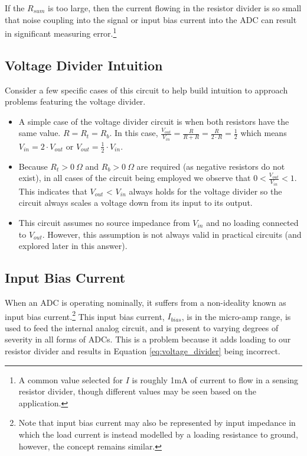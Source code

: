 \documentclass[main.tex]{subfiles}
\begin{document}
\newnoindentpara If the $R_{sum}$ is too large, then the current flowing in the resistor divider is so small that noise coupling into the signal or input bias current into the ADC can result in significant measuring error.\footnote{A common value selected for $I$ is roughly 1mA of current to flow in a sensing resistor divider, though different values may be seen based on the application.}

\subsection{Voltage Divider Intuition}
Consider a few specific cases of this circuit to help build intuition to approach problems featuring the voltage divider.
\begin{itemize}
    \item A simple case of the voltage divider circuit is when both resistors have the same value. $R = R_t = R_b$. In this case, $\frac{V_{out}}{V_{in}} = \frac{R}{R+R} = \frac{R}{2 \cdot R} = \frac{1}{2}$ which means $V_{in} = 2 \cdot V_{out}$ or $V_{out} = \frac{1}{2} \cdot V_{in}$.
    \item Because $R_t > 0 \ \Omega$ and $R_b > 0 \ \Omega$ are required (as negative resistors do not exist), in all cases of the circuit being employed we observe that $0 < \frac{V_{out}}{V_{in}} < 1$. This indicates that $V_{out}$ < $V_{in}$ always holds for the voltage divider so the circuit always scales a voltage down from its input to its output.
    \item This circuit assumes no source impedance from $V_{in}$ and no loading connected to $V_{out}$. However, this assumption is not always valid in practical circuits (and explored later in this answer).
\end{itemize}

\subsection{Input Bias Current}
When an ADC is operating nominally, it suffers from a non-ideality known as input bias current.\footnote{Note that input bias current may also be represented by input impedance in which the load current is instead modelled by a loading resistance to ground, however, the concept remains similar.} This input bias current, $I_{bias}$, is in the micro-amp range, is used to feed the internal analog circuit, and is present to varying degrees of severity in all forms of ADCs. This is a problem because it adds loading to our resistor divider and results in Equation \eqref{eq:voltage_divider} being incorrect. 
\end{document}
